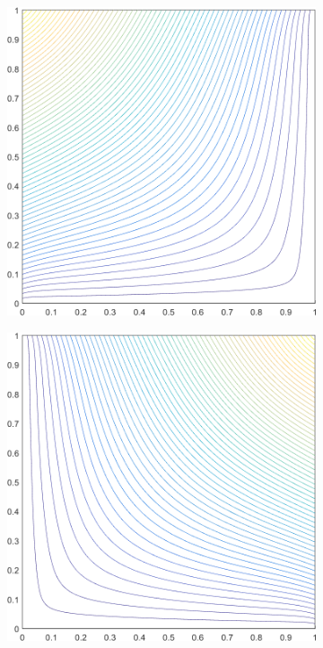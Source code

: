 \begin{figure}
\label{fig::2D_MV1_unit_square_basis_functions}
\centering
	\begin{subfigure}[b]{0.39\textwidth}
		\centering
		\includegraphics[width=\textwidth]{figures/sec_BF/square_MV1_contour_b4.png}
		\caption{}
	\end{subfigure}
	\hspace{1.5cm}
	\begin{subfigure}[b]{0.39\textwidth}
		\centering
		\includegraphics[width=\textwidth]{figures/sec_BF/square_MV1_contour_b3.png}

\end{subfigure}
\end{figure}
